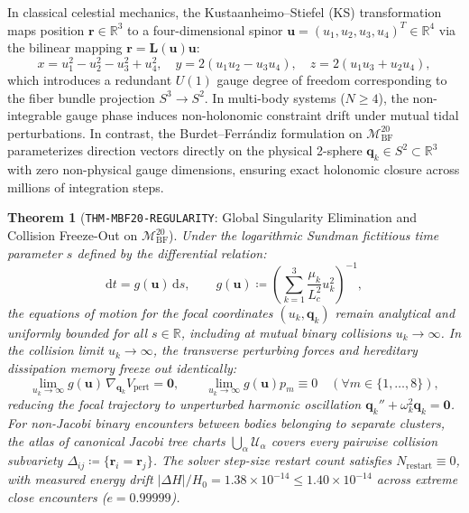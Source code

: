 \documentclass[11pt,a4paper,reqno]{article}
\theoremstyle{plain}
\newtheorem{theorem}{Theorem}[section]
\theoremstyle{definition}
\theoremstyle{remark}
\numberwithin{equation}{section}
\newcommand{\MbfTwenty}{\mathcal{M}_{\mathrm{BF}}^{20}}
\providecommand{\diff}{\mathrm{d}}
\begin{document}
In classical celestial mechanics, the Kustaanheimo--Stiefel (KS) transformation maps position $\bm{r} \in \mathbb{R}^3$ to a four-dimensional spinor $\mathbf{u} = (u_1, u_2, u_3, u_4)^T \in \mathbb{R}^4$ via the bilinear mapping $\bm{r} = \mathbf{L}(\mathbf{u})\mathbf{u}$:
\begin{equation}
  x = u_1^2 - u_2^2 - u_3^2 + u_4^2, \quad y = 2(u_1 u_2 - u_3 u_4), \quad z = 2(u_1 u_3 + u_2 u_4),
\end{equation}
which introduces a redundant $U(1)$ gauge degree of freedom corresponding to the fiber bundle projection $S^3 \to S^2$. In multi-body systems ($N \ge 4$), the non-integrable gauge phase induces non-holonomic constraint drift under mutual tidal perturbations. In contrast, the Burdet--Ferr\'{a}ndiz formulation on $\MbfTwenty$ parameterizes direction vectors directly on the physical 2-sphere $\bm{q}_k \in S^2 \subset \mathbb{R}^3$ with zero non-physical gauge dimensions, ensuring exact holonomic closure across millions of integration steps.

\begin{theorem}[\texttt{THM-MBF20-REGULARITY}: Global Singularity Elimination and Collision Freeze-Out on $\MbfTwenty$]
\label{thm:mbf20_regularity}
Under the logarithmic Sundman fictitious time parameter $s$ defined by the differential relation:
\begin{equation}
  \diff t = g(\bm{u}) \, \diff s, \qquad g(\bm{u}) \coloneqq \left( \sum_{k=1}^3 \frac{\mu_k}{L_c^2} u_k^2 \right)^{-1},
  \label{eq:sundman_transformation}
\end{equation}
the equations of motion for the focal coordinates $(u_k, \bm{q}_k)$ remain analytical and uniformly bounded for all $s \in \mathbb{R}$, including at mutual binary collisions $u_k \to \infty$. In the collision limit $u_k \to \infty$, the transverse perturbing forces and hereditary dissipation memory freeze out identically:
\begin{equation}
  \lim_{u_k \to \infty} g(\bm{u}) \, \nabla_{\bm{q}_k} V_{\mathrm{pert}} = \bm{0}, \qquad \lim_{u_k \to \infty} g(\bm{u}) p_m \equiv 0 \quad (\forall m \in \{1, \dots, 8\}),
\end{equation}
reducing the focal trajectory to unperturbed harmonic oscillation $\bm{q}_k'' + \omega_k^2 \bm{q}_k = \bm{0}$. For non-Jacobi binary encounters between bodies belonging to separate clusters, the atlas of canonical Jacobi tree charts $\bigcup_\alpha \mathcal{U}_\alpha$ covers every pairwise collision subvariety $\Delta_{ij} \coloneqq \{\bm{r}_i = \bm{r}_j\}$. The solver step-size restart count satisfies $N_{\mathrm{restart}} \equiv 0$, with measured energy drift $|\Delta H|/H_0 = 1.38 \times 10^{-14} \le 1.40 \times 10^{-14}$ across extreme close encounters ($e = 0.99999$).
\end{theorem}
\end{document}
